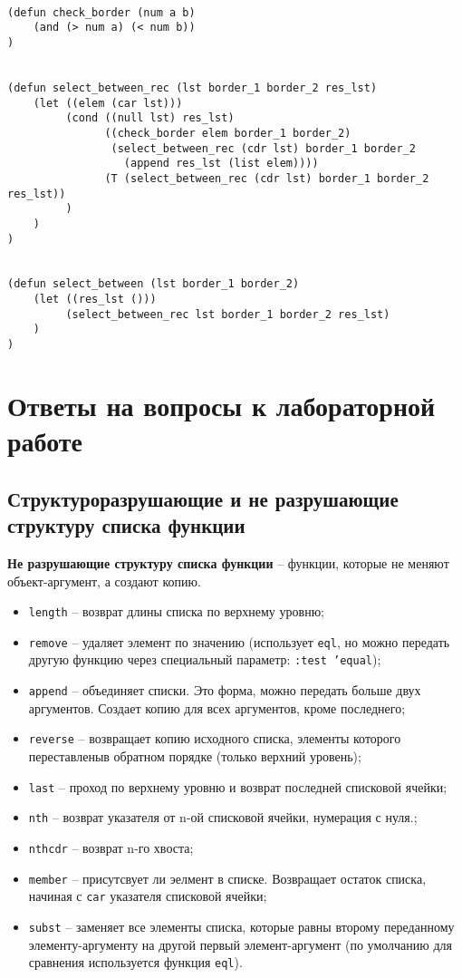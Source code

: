 \begin{lstlisting}
    
(defun check_border (num a b)
    (and (> num a) (< num b))
)


(defun select_between_rec (lst border_1 border_2 res_lst)
    (let ((elem (car lst)))
         (cond ((null lst) res_lst)
               ((check_border elem border_1 border_2) 
                (select_between_rec (cdr lst) border_1 border_2 
                  (append res_lst (list elem))))
               (T (select_between_rec (cdr lst) border_1 border_2 res_lst))
         )
    )
)


(defun select_between (lst border_1 border_2)
    (let ((res_lst ()))
         (select_between_rec lst border_1 border_2 res_lst)
    )
)  
\end{lstlisting}




\chapter{Ответы на вопросы к лабораторной работе}

\section{Структуроразрушающие и не разрушающие структуру списка функции}

\textbf{Не разрушающие структуру списка функции} -- функции, которые не меняют объект-аргумент, а создают копию.

\begin{itemize}
    \item \texttt{length} -- возврат длины списка по верхнему уровню;
    \item \texttt{remove} -- удаляет элемент по значению (использует \texttt{eql}, но можно передать другую функцию через специальный параметр: \texttt{:test 'equal});
    \item \texttt{append} -- объединяет списки. Это форма, можно передать больше двух аргументов. Создает копию для всех аргументов, кроме последнего;
    \item \texttt{reverse} -- возвращает копию исходного списка, элементы которого переставленыв обратном порядке (только верхний уровень);
    \item \texttt{last} -- проход по верхнему уровню и возврат последней списковой ячейки;
    \item \texttt{nth} -- возврат указателя от n-ой списковой ячейки, нумерация с нуля.;
    \item \texttt{nthcdr} -- возврат n-го хвоста;
    \item \texttt{member} -- присутсвует ли эелмент в списке. Возвращает остаток списка, начиная с \texttt{car} указателя списковой ячейки;
    \item \texttt{subst} -- заменяет все элементы списка, которые равны второму переданному элементу-аргументу на другой первый элемент-аргумент (по умолчанию для сравнения используется функция \texttt{eql}).
\end{itemize}


